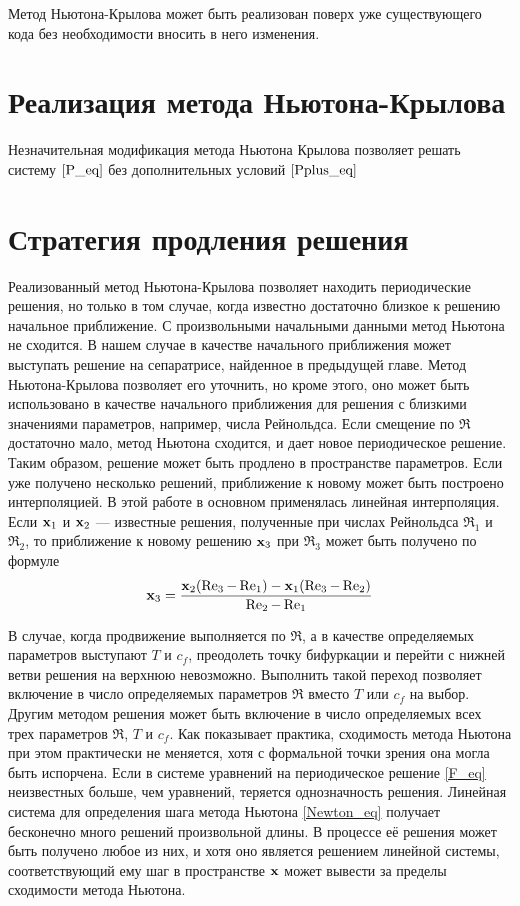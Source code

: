 Метод Ньютона-Крылова может быть реализован поверх уже существующего кода без необходимости вносить в него изменения. 


\section{Реализация метода Ньютона-Крылова}

Незначительная модификация метода Ньютона Крылова позволяет решать систему $\eqref{P_eq}$ без дополнительных условий $\eqref{Pplus_eq}$ 


\section{Стратегия продления решения}

Реализованный метод Ньютона-Крылова позволяет находить периодические решения, но только в том случае, когда известно достаточно близкое к решению начальное приближение. С произвольными начальными данными метод Ньютона не сходится. В нашем случае в качестве начального приближения может выступать решение на сепаратрисе, найденное в предыдущей главе. Метод Ньютона-Крылова позволяет его уточнить, но кроме этого, оно может быть использовано в качестве начального приближения для решения с близкими значениями параметров, например, числа Рейнольдса. Если смещение по $\Re$ достаточно мало, метод Ньютона сходится, и дает новое периодическое решение. Таким образом, решение может быть продлено в пространстве параметров. Если уже получено несколько решений, приближение к новому может быть построено интерполяцией. В этой работе в основном применялась линейная интерполяция. Если $\mathbf{x}_1$ и $\mathbf{x}_2$ --- известные решения, полученные при числах Рейнольдса $\Re_1$ и $\Re_2$, то приближение к новому решению $\mathbf{x}_3$ при $\Re_3$ может быть получено по формуле 
\begin{equation}
\mathbf{x}_3 = \frac{\mathbf{x}_2(\operatorname{Re}_3 - \operatorname{Re}_1) - \mathbf{x}_1(\operatorname{Re}_3-\operatorname{Re}_2)}{\operatorname{Re}_2 - \operatorname{Re}_1}
\end{equation}

В случае, когда продвижение выполняется по $\Re$, а в качестве определяемых параметров выступают $T$ и $c_f$, преодолеть точку бифуркации и перейти с нижней ветви решения на верхнюю невозможно. Выполнить такой переход позволяет включение в число определяемых параметров $\Re$ вместо $T$ или $c_f$ на выбор. Другим методом решения может быть включение в число определяемых всех трех параметров $\Re$, $T$ и $c_f$. Как показывает практика, сходимость метода Ньютона при этом практически не меняется, хотя с формальной точки зрения она могла быть испорчена. Если в системе уравнений на периодическое решение \eqref{F_eq} неизвестных больше, чем уравнений, теряется однозначность решения. Линейная система для определения шага метода Ньютона \eqref{Newton_eq} получает бесконечно много решений произвольной длины. В процессе её решения может быть получено любое из них, и хотя оно является решением линейной системы, соответствующий ему шаг в пространстве $\mathbf{x}$ может вывести за пределы сходимости метода Ньютона. 

